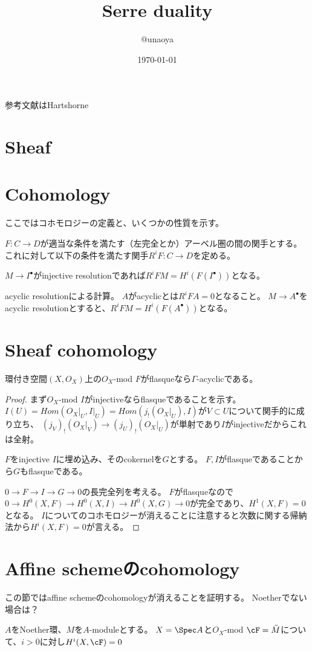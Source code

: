 \documentclass{jsarticle}
\title{Serre duality}
\author{@unaoya}
\date{\today}
\begin{document}
\maketitle

参考文献はHartshorne

\section{Sheaf}

\section{Cohomology}
ここではコホモロジーの定義と、いくつかの性質を示す。

$F:C \to D$が適当な条件を満たす（左完全とか）アーベル圏の間の関手とする。
これに対して以下の条件を満たす関手$R^iF:C \to D$を定める。

$M \to I^\bullet$がinjective resolutionであれば$R^iFM = H^i(F(I^\bullet))$となる。

acyclic resolutionによる計算。
$A$がacyclicとは$R^iFA=0$となること。
$M \to A^\bullet$をacyclic resolutionとすると、$R^iFM = H^i(F(A^\bullet))$となる。


\section{Sheaf cohomology}
\begin{lem}
環付き空間$(X, O_X)$上の$O_X$-mod $F$がflasqueなら$\Gamma$-acyclicである。
\end{lem}
\begin{proof}
まず$O_X$-mod $I$がinjectiveならflasqueであることを示す。
$I(U) = Hom(O_X\vert_U, I\vert_U) = Hom(j_!(O_X\vert_U),I)$が$V \subset U$について関手的に成り立ち、
$(j_V)_!(O_X\vert_V) \to (j_U)_!(O_X\vert_U)$が単射であり$I$がinjectiveだからこれは全射。

$F$をinjective $I$に埋め込み、そのcokernelを$G$とする。
$F, I$がflasqueであることから$G$もflasqueである。

$0 \to F \to I \to G \to 0$の長完全列を考える。
$F$がflasqueなので$0 \to H^0(X, F) \to H^0(X,I) \to H^0(X,G) \to 0$が完全であり、$H^1(X, F)=0$となる。
$I$についてのコホモロジーが消えることに注意すると次数に関する帰納法から$H^i(X,F)=0$が言える。
\end{proof}


\section{Affine schemeのcohomology}
この節ではaffine schemeのcohomologyが消えることを証明する。
Noetherでない場合は？
\begin{thm}
$A$をNoether環、$M$を$A$-moduleとする。
$X =\Spec A$と$O_X$-mod $\cF=\tilde{M}$について、$i>0$に対し$H^i(X,\cF)=0$
\end{thm}
\end{document}
